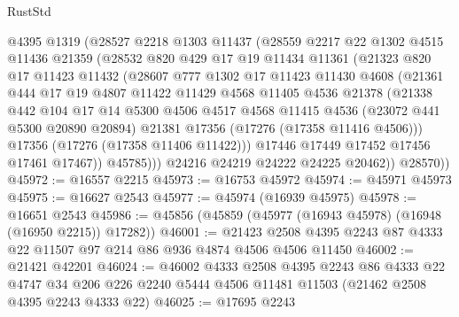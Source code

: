 \begin{lexlean}{RustStd}
\begin{coremodule}
            @4395
            @1319
            (@28527
              @2218
              @1303
              @11437
              (@28559
                @2217
                @22
                @1302
                @4515
                @11436
                @21359
                (@28532
                  @820
                  @429
                  @17
                  @19
                  @11434
                  @11361
                  (@21323
                    @820
                    @17
                    @11423
                    @11432
                    (@28607
                      @777
                      @1302
                      @17
                      @11423
                      @11430
                      @4608
                      (@21361
                        @444
                        @17
                        @19
                        @4807
                        @11422
                        @11429
                        @4568
                        @11405
                        @4536
                        @21378
                        (@21338
                          @442
                          @104
                          @17
                          @14
                          @5300
                          @4506
                          @4517
                          @4568
                          @11415
                          @4536
                          (@23072 @441 @5300 @20890 @20894)
                          @21381
                          @17356
                          (@17276 (@17358 @11416 @4506)))
                        @17356
                        (@17276 (@17358 @11406 @11422)))
                      @17446
                      @17449
                      @17452
                      @17456
                      @17461
                      @17467))
                  @45785)))
            @24216
            @24219
            @24222
            @24225
            @20462))
        @28570))
@45972 := @16557 @2215
@45973 := @16753 @45972
@45974 := @45971 @45973
@45975 := @16627 @2543
@45977 := @45974 (@16939 @45975)
@45978 := @16651 @2543
@45986 := @45856 (@45859 (@45977 (@16943 @45978) (@16948 (@16950 @2215)) @17282))
@46001 := @21423 @2508 @4395 @2243 @87 @4333 @22 @11507 @97 @214 @86 @936 @4874 @4506 @4506 @11450
@46002 := @21421 @42201
@46024 := @46002
    @4333
    @2508
    @4395
    @2243
    @86
    @4333
    @22
    @4747
    @34
    @206
    @226
    @2240
    @5444
    @4506
    @11481
    @11503
    (@21462 @2508 @4395 @2243 @4333 @22)
@46025 := @17695 @2243

\end{coremodule}
\end{lexlean}

